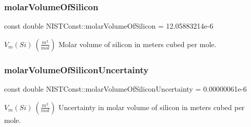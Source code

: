 \subsubsection{\texorpdfstring{molar\+Volume\+Of\+Silicon}{molarVolumeOfSilicon}}
{\footnotesize\ttfamily const double N\+I\+S\+T\+Const\+::molar\+Volume\+Of\+Silicon = 12.\+05883214e-\/6}

$V_m(Si) \ (\frac{m^3}{mol})$ Molar volume of silicon in meters cubed per mole. \mbox{\label{group___silicon_ga35b10008977416da18242a7e7808fc0d}} 
\subsubsection{\texorpdfstring{molar\+Volume\+Of\+Silicon\+Uncertainty}{molarVolumeOfSiliconUncertainty}}
{\footnotesize\ttfamily const double N\+I\+S\+T\+Const\+::molar\+Volume\+Of\+Silicon\+Uncertainty = 0.\+00000061e-\/6}

$V_m(Si) \ (\frac{m^3}{mol})$ Uncertainty in molar volume of silicon in meters cubed per mole. 